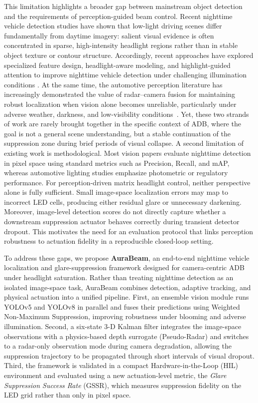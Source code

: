 \documentclass[pdflatex,sn-mathphys-num]{sn-jnl}%
\theoremstyle{thmstyleone}%
\theoremstyle{thmstyletwo}%
\theoremstyle{thmstylethree}%
\begin{document}
This limitation highlights a broader gap between mainstream object detection and the requirements of perception-guided beam control. Recent nighttime vehicle detection studies have shown that low-light driving scenes differ fundamentally from daytime imagery: salient visual evidence is often concentrated in sparse, high-intensity headlight regions rather than in stable object texture or contour structure.
Accordingly, recent approaches have explored specialized feature design, headlight-aware modeling, and highlight-guided attention to improve nighttime vehicle detection under challenging illumination conditions \cite{zhang2024vision,lashkov2025machine,song2025highlightnet}.
At the same time, the automotive perception literature has increasingly
demonstrated the value of radar--camera fusion for maintaining robust
localization when vision alone becomes unreliable, particularly under
adverse weather, darkness, and low-visibility
conditions~\cite{yao2023radar,deng2025advances,xiao2025radar}.
Yet, these two strands of work are rarely brought together in the specific context of ADB, where the goal is not a general scene understanding, but a stable continuation of the suppression zone during brief periods of visual collapse. A second limitation of existing work is methodological. Most vision papers evaluate nighttime detection in pixel space using standard metrics such as Precision, Recall, and mAP, whereas automotive lighting studies emphasize photometric or regulatory performance. For perception-driven matrix headlight control, neither perspective alone is
fully sufficient. Small image-space localization errors may map to incorrect LED cells, producing either residual glare or unnecessary darkening. Moreover, image-level detection scores do not directly capture whether a downstream suppression actuator behaves correctly during transient detector dropout. This motivates the need for an
evaluation protocol that links perception robustness to actuation fidelity in a reproducible closed-loop setting.

To address these gaps, we propose  \textbf{AuraBeam}, an end-to-end nighttime vehicle localization and glare-suppression framework designed for camera-centric ADB under headlight saturation. Rather than treating
nighttime detection as an isolated image-space task, AuraBeam combines detection, adaptive tracking, and physical actuation into a unified pipeline. First, an ensemble vision module runs YOLOv5 and YOLOv8 in parallel and fuses their predictions using Weighted Non-Maximum
Suppression, improving robustness under blooming and adverse illumination. Second, a six-state 3-D Kalman filter integrates the
image-space observations with a physics-based depth surrogate (Pseudo-Radar) and switches to a radar-only observation mode during
camera degradation, allowing the suppression trajectory to be propagated through short intervals of visual dropout. Third, the framework is validated in a compact Hardware-in-the-Loop (HIL) environment and evaluated using a new actuation-level metric, the \emph{Glare Suppression Success Rate} (GSSR), which measures suppression fidelity on the LED grid rather than only in pixel space.
\end{document}
